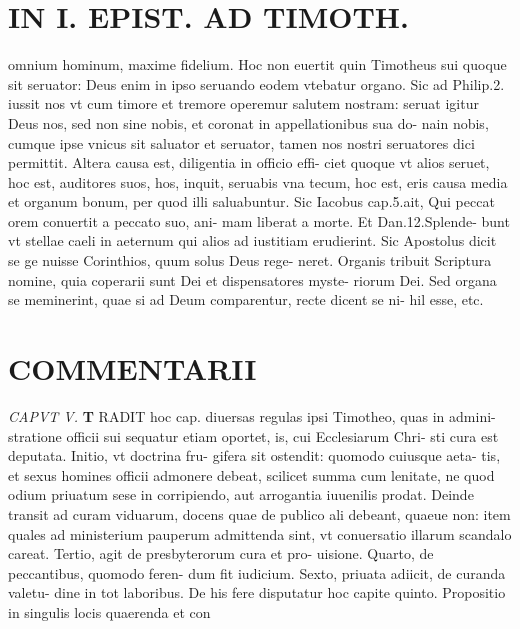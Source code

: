 \documentclass{article}
\begin{document}
\begin{pages}
\section*{IN I. EPIST. AD TIMOTH. }
\marginpar{[ p.115 ]}\pstart omnium hominum, maxime fidelium. Hoc non euertit quin Timotheus sui quoque sit seruator: Deus enim in ipso seruando eodem vtebatur organo. Sic ad Philip.2. iussit nos vt cum timore et tremore operemur salutem nostram: seruat igitur Deus nos, sed non sine nobis, et coronat in appellationibus sua do- nain nobis, cumque ipse vnicus sit saluator et seruator, tamen nos nostri seruatores dici permittit.  \pend\pstart Altera causa est, diligentia in officio effi- ciet quoque vt alios seruet, hoc est, auditores suos, hos, inquit, seruabis vna tecum, hoc est, eris causa media et organum bonum, per quod illi saluabuntur. Sic Iacobus cap.5.ait, Qui peccat orem conuertit a peccato suo, ani- mam liberat a morte. Et Dan.12.Splende- bunt vt stellae caeli in aeternum qui alios ad iustitiam erudierint. Sic Apostolus dicit se ge nuisse Corinthios, quum solus Deus rege- neret.  \pend\pstart Organis tribuit Scriptura nomine, quia coperarii sunt Dei et dispensatores myste- riorum Dei. Sed organa se meminerint, quae si ad Deum comparentur, recte dicent se ni- hil esse, etc.  \pend
\marginpar{[ p.116 ]}
\section*{COMMENTARII }
\textit{CAPVT V. }
\textbf{T }\pstart RADIT hoc cap. diuersas regulas ipsi Timotheo, quas in admini- stratione officii sui sequatur etiam oportet, is, cui Ecclesiarum Chri- sti cura est deputata. Initio, vt doctrina fru- gifera sit ostendit: quomodo cuiusque aeta- tis, et sexus homines officii admonere debeat, scilicet summa cum lenitate, ne quod odium priuatum sese in corripiendo, aut arrogantia iuuenilis prodat.  \pend\pstart Deinde transit ad curam viduarum, docens quae de publico ali debeant, quaeue non: item quales ad ministerium pauperum admittenda sint, vt conuersatio illarum scandalo careat.  \pend\pstart Tertio, agit de presbyterorum cura et pro- uisione.  \pend\pstart Quarto, de peccantibus, quomodo feren- dum fit iudicium.  \pend\pstart Sexto, priuata adiicit, de curanda valetu- dine in tot laboribus. De his fere disputatur hoc capite quinto.  \pend\pstart Propositio in singulis locis quaerenda et con  \pend

\end{pages}
\end{document}
